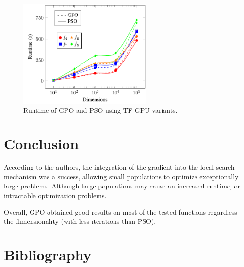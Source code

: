 \documentclass[10pt]{article}
\begin{document}
\begin{figure}[h!]
 \centering
 \includegraphics[width=0.6\textwidth]{runtimeGpu.png}
 \caption{Runtime of GPO and PSO using TF-GPU variants.
          \label{runtimeGpu}}
\end{figure}

\section{Conclusion}

According to the authors, the integration of the gradient into the local search
mechanism was a success, allowing small populations to optimize exceptionally
large problems. Although large populations may cause an increased runtime, or
intractable optimization problems.

Overall, GPO obtained good results on most of the tested functions regardless
the dimensionality (with less iterations than PSO).

\section*{Bibliography}

\printbibliography
\end{document}

